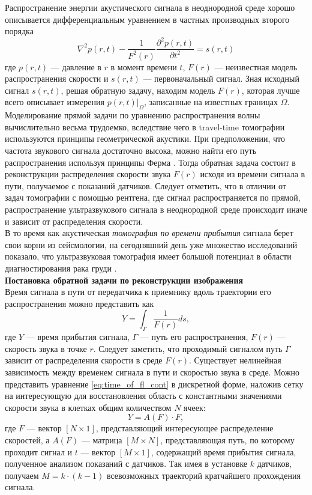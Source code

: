 \documentclass[14pt]{matmex-diploma}
\begin{document}
Распространение энергии акустического сигнала в неоднородной среде хорошо описывается дифференциальным уравнением в частных производных второго порядка
$$\nabla^2p(r,t) - \frac{1}{F^2(r)}\frac{\partial^2p(r,t)}{\partial t^2} = s(r,t)$$
где $p(r, t)$ --- давление в $r$ в момент времени $t$, $F(r)$ --- неизвестная модель распространения скорости и $s(r,t)$ --- первоначальный сигнал. Зная исходный сигнал $s(r, t)$, решая обратную задачу, находим модель $F(r)$, которая лучше всего описывает измерения $p(r,t)|_{\Omega}$, записанные на известных границах $\Omega$.\\

Моделирование прямой задачи по уравнению распространения волны вычислительно весьма трудоемко, вследствие чего в travel-time томографии используются принципы геометрической акустики. При предположении, что частота звукового сигнала достаточно высока, можно найти его путь распространения используя принципы Ферма \cite{schuster1904introduction}. Тогда обратная задача состоит в реконструкции распределения скорости звука $F(r)$ исходя из времени сигнала в пути, получаемое с показаний датчиков. Следует отметить, что в отличии от задач томографии с помощью рентгена, где сигнал распространяется по прямой, распространение ультразвукового сигнала в неоднородной среде происходит иначе и зависит от распределения скорости.\\

В то время как акустическая \textit{томография по времени прибытия} сигнала берет свои корни из сейсмологии\cite{dines1979computerized}, на сегодняшний день уже множество исследований показало, что ультразвуковая томография имеет большой потенциал в области диагностирования рака груди \cite{duric2007detection}. \\

\textbf{Постановка обратной задачи по реконструкции изображения}\\
Время сигнала в пути от передатчика к приемнику вдоль траектории его распространения можно представить как
\begin{equation}\label{eq:time_of_fl_cont}
Y = \int_\Gamma \frac{1}{F(r)}ds,
\end{equation}
где $Y$ --- время прибытия сигнала, $\Gamma$ --- путь его распространения, $F(r)$ --- скорость звука в точке $r$. Следует заметить, что проходимый сигналом путь $\Gamma$ зависит от распределения скорости в среде $F(r)$. Существует нелинейная зависимость между временем сигнала в пути и скоростью звука в среде. Можно представить уравнение \eqref{eq:time_of_fl_cont} в дискретной форме, наложив сетку на интересующую для восстановления область с константными значениями скорости звука в клетках общим количеством $N$ ячеек:
\begin{equation}\label{eq:2}
Y = A(F)\cdot F,
\end{equation}
где $F$ --- вектор $[N\times 1]$, представляющий интересующее распределение скоростей, а $A(F)$ --- матрица $[M\times N]$, представляющая путь, по которому проходит сигнал и $t$ --- вектор $[M\times 1]$, содержащий время прибытия сигнала, полученное анализом показаний с датчиков. Так имея в установке $k$ датчиков, получаем $M = k\cdot (k-1)$ всевозможных траекторий кратчайшего прохождения сигнала. \\
\end{document}
